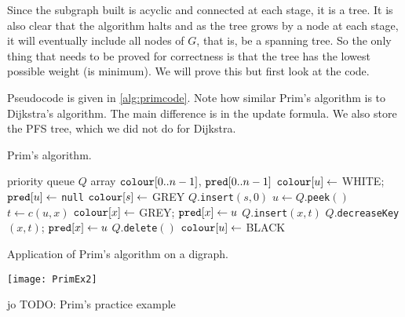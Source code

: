 Since the subgraph built is acyclic and connected at each stage, it is a tree.
It is also clear that the algorithm halts and as the tree grows by a node at each stage, 
it will eventually include all nodes of $G$, that is, be a spanning tree. 
So the only thing that needs to be proved for correctness is that the tree has the lowest possible weight (is minimum). 
We will prove this but first look at the code.

Pseudocode is given in \cref{alg:primcode}. 
Note how similar Prim's algorithm is to Dijkstra's algorithm. 
The main difference is in the update formula. We also store the PFS tree, which we did not do for Dijkstra.

\begin{algorithm}[H]
  \caption{Prim's algorithm.}
  \label{alg:primcode}
\begin{algorithmic}[1]
	\State priority queue $Q$
	\State array $\operatorname{\text{\texttt{colour}}}[0..n-1]$, $\operatorname{\text{\texttt{pred}}}[0..n-1]$
		\State $\operatorname{\text{\texttt{colour}}}[u] \gets$ WHITE; $\operatorname{\text{\texttt{pred}}}[u] \gets$ \texttt{null} 
	\EndFor
	\State $\operatorname{\text{\texttt{colour}}}[s] \gets $ GREY
	\State $Q$.\texttt{insert}$(s, 0)$
		\State $u \gets Q$.\texttt{peek}$()$
			\State $t \gets c(u, x)$
				\State $\operatorname{\text{\texttt{colour}}}[x] \gets $ GREY; $\operatorname{\text{\texttt{pred}}}[x] \gets u$
				\State $Q$.\texttt{insert}$(x, t)$
				\State $Q$.\texttt{decreaseKey}$(x, t)$; $\operatorname{\text{\texttt{pred}}}[x] \gets u$
			\EndIf
		\EndFor
		\State $Q$.\texttt{delete}$()$
		\State $\operatorname{\text{\texttt{colour}}}[u] \gets $ BLACK
	\EndWhile
	\State \Return{$\pred$}
\EndFunction
\end{algorithmic}
\end{algorithm}


\begin{Boxample}
Application of Prim's algorithm on a digraph.
\begin{center}
\texttt{[image: PrimEx2]}
\end{center}
\end{Boxample}

\begin{Boxample}[0]
jo TODO: Prim's practice example
\end{Boxample}

